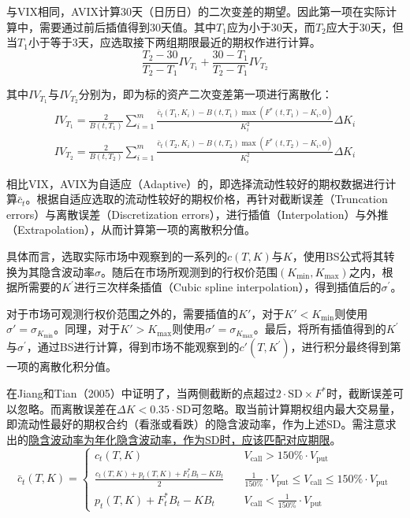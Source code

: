 \documentclass[11pt]{article}
\begin{document}
与VIX相同，AVIX计算30天（日历日）的二次变差的期望。因此第一项在实际计算中，需要通过前后插值得到30天值。其中$T_1$应为小于30天，而$T_2$应大于30天，但当$T_1$小于等于3天，应选取接下两组期限最近的期权作进行计算。
\begin{equation*}
    \frac{T_2 - 30}{T_2 - T_1} IV_{T_1} + 
    \frac{30 - T_1}{T_2 - T_1} IV_{T_2}
\end{equation*}

其中$IV_{T_1}$与$IV_{T_2}$分别为，即为标的资产二次变差第一项进行离散化：
\begin{gather*}
    IV_{T_1} = \frac{2}{B(t,T_1)} \sum_{i=1}^{m} \frac{\bar{c}_t(T_1,K_i) - B(t,T_1) \max\left(F^{*}(t,T_1)-K_i,0\right)}{K_{i}^{2}} \Delta K_i \\
    IV_{T_2} = \frac{2}{B(t,T_2)} \sum_{i=1}^{m} \frac{\bar{c}_t(T_2,K_i) - B(t,T_2) \max\left(F^{*}(t,T_2)-K_i,0\right)}{K_{i}^{2}} \Delta K_i
\end{gather*}

相比VIX，AVIX为自适应（Adaptive）的，即选择流动性较好的期权数据进行计算$\bar{c}_t$。根据自适应选取的流动性较好的期权价格，再针对截断误差（Truncation errors）与离散误差（Discretization errors），进行插值（Interpolation）与外推（Extrapolation），从而计算第一项的离散积分值。

具体而言，选取实际市场中观察到的一系列的$c(T,K)$与$K$，使用BS公式将其转换为其隐含波动率$\sigma$。随后在市场所观测到的行权价范围$(K_{\min},K_{\max})$之内，根据所需要的$K^{'}$进行三次样条插值（Cubic spline interpolation），得到插值后的$\sigma^{'}$。

对于市场可观测行权价范围之外的，需要插值的$K'$，对于$K'<K_{\min}$则使用$\sigma' = \sigma_{K_{\min}}$。同理，对于$K'>K_{\max}$则使用$\sigma' = \sigma_{K_{\max}}$。最后，将所有插值得到的$K^{'}$与$\sigma^{'}$，通过BS进行计算，得到市场不能观察到的$c'(T,K^{'})$，进行积分最终得到第一项的离散化积分值。

在Jiang和Tian（2005）中证明了，当两侧截断的点超过$2\cdot \text{SD} \times F^{*}$时，截断误差可以忽略。而离散误差在$\Delta K < 0.35 \cdot \text{SD}$可忽略。取当前计算期权组内最大交易量，即流动性最好的期权合约（看涨或看跌）的隐含波动率，作为上述SD。需注意求出的\uline{隐含波动率为年化隐含波动率，作为SD时，应该匹配对应期限}。
\begin{equation*}
    \bar{c}_t(T,K) = \left\{
    \begin{array}{cl}
        c_t(T,K) &\quad V_\text{call} > 150\% \cdot V_\text{put} \\
        \frac{c_t(T,K) + p_t(T,K) + F_{t}^{*} B_t - K B_t}{2} &\quad \frac{1}{150\%} \cdot V_\text{put} \leq V_\text{call} \leq 150\% \cdot V_\text{put} \\
        p_t(T,K) + F_{t}^{*} B_t - K B_t &\quad V_\text{call} < \frac{1}{150\%} \cdot V_\text{put}
    \end{array}
    \right.
\end{equation*}
\end{document}
